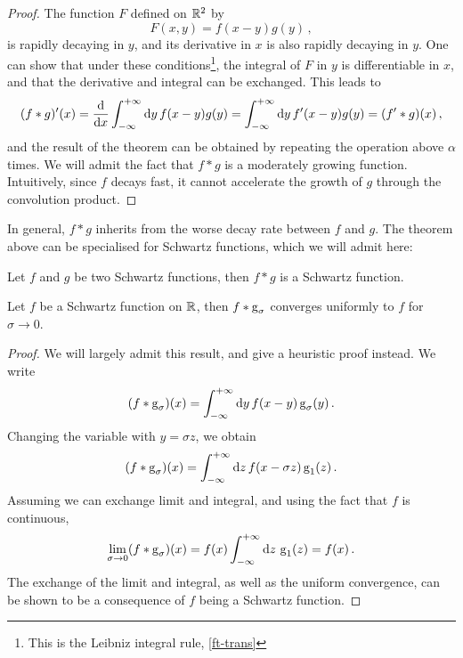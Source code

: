 \begin{proof}
  The function $F$ defined on $\mathbb{R}^2$ by
  \begin{equation}
    F(x,y)=f(x-y)g(y)\,,
  \end{equation}
  is rapidly decaying in $y$, and its derivative in $x$ is also rapidly decaying in $y$.
  One can show that under these conditions\footnote{This is the Leibniz integral rule,
  \cf\cref{ft-trans}}, the integral of $F$ in $y$ is differentiable in $x$, and that the
  derivative and integral can be exchanged. This leads to
  \begin{equation}
    (f\ast g)'(x)=\frac{\mathrm{d}}{\mathrm{d} x}\int_{-\infty}^{+\infty}\mathrm{d}{y}\,f(x-y)g(y)
    =\int_{-\infty}^{+\infty}\mathrm{d}{y}\,f'(x-y)g(y)=(f'\ast g)(x)\,,
  \end{equation}
  and the result of the theorem can be obtained by repeating the operation above $\alpha$
  times. We will admit the fact that $f\ast g$ is a moderately growing function.
  Intuitively, since $f$ decays fast, it cannot accelerate the growth of $g$ through the
  convolution product.
\end{proof}
In general, $f\ast g$ inherits from the worse decay rate between $f$ and $g$. The theorem
above can be specialised for Schwartz functions, which we will admit here:
\begin{proposition}
  Let $f$ and $g$ be two Schwartz functions, then $f\ast g$ is a Schwartz function.
\end{proposition}
\begin{theorem}
  \label{thm:gaussian-unit}
  Let $f$ be a Schwartz function on $\mathbb{R}$, then $f\ast \operatorname{g}_{\sigma}$ converges uniformly
  to $f$ for $\sigma\to 0$.
\end{theorem}
\begin{proof}
  We will largely admit this result, and give a heuristic proof instead. We write
  \begin{equation}
    (f\ast \operatorname{g}_{\sigma})(x)=\int_{-\infty}^{+\infty}\mathrm{d}{y}\,f(x-y)\operatorname{g}_{\sigma}(y)\,.
  \end{equation}
  Changing the variable with $y=\sigma z$, we obtain
  \begin{equation}
    (f\ast \operatorname{g}_{\sigma})(x)=\int_{-\infty}^{+\infty}\mathrm{d}{z}\,f(x-\sigma z)\operatorname{g}_{1}(z)\,.
  \end{equation}
  Assuming we can exchange limit and integral, and using the fact that $f$ is continuous,
  \begin{equation}
    \lim_{\sigma\to 0}(f\ast \operatorname{g}_{\sigma})(x)=f(x)\int_{-\infty}^{+\infty}\mathrm{d}{z}\,\operatorname{g}_{1}(z)=f(x)\,.
  \end{equation}
  The exchange of the limit and integral, as well as the uniform convergence, can be shown
  to be a consequence of $f$ being a Schwartz function.
\end{proof}
